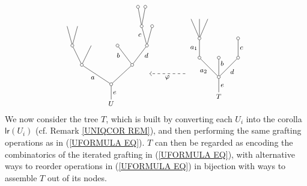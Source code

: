\documentclass[a4paper,10pt]{article}%
\begin{document}
\begin{example}
\begin{equation}
\begin{tikzpicture}[grow=up,auto,level distance=2.1em,
	every node/.style = {font=\footnotesize,inner sep=2pt},
	dummy/.style={circle,draw,inner sep=0pt,minimum size=1.25mm}]
\begin{scope}[yshift=1em]
	\begin{scope}[level distance=2.3em]
	\tikzstyle{level 2}=[sibling distance=3.5em]%
	\tikzstyle{level 3}=[sibling distance=2.25em]%
	\tikzstyle{level 4}=[sibling distance=1.25em]%
	\tikzstyle{level 5}=[sibling distance=0.875em]%
		\node at (5.5,0) {$U$}
			child{node [dummy] {}
				child[sibling distance =5em]{node [dummy] {}
					child[sibling distance =3.5em]{node [dummy] {}
						child{node [dummy] {}
						}
						child{node [dummy] {}
							child{node [dummy] {}}
							child{node [dummy] {}}
						edge from parent node [near end] {$c$}}
					edge from parent node [swap, near end] {$d$}}
					child[sibling distance =3.5em]{node [dummy] {}
					edge from parent node [near end] {$b$}}
				}
				child[sibling distance =7em]{node [dummy] {}
					child
					child{node [dummy] {}
						child
						child
					}
				edge from parent node {$a$}}
			edge from parent node [swap] {$e$}};
	\end{scope}
	\begin{scope}[level distance=2.3em]
	\tikzstyle{level 2}=[sibling distance=2.3em]%
	\tikzstyle{level 4}=[sibling distance=1em]%
		\node at (10,0.3) {$T$}
			child{node [dummy] {}
				child{node [dummy] {}
					child{node [dummy] {}
					edge from parent node [swap] {$c$}}	
				edge from parent node [swap] {$d$}}
				child{node [dummy] {}
				edge from parent node [near end,swap] {$b$}}
				child{node [dummy] {}
					child{node [dummy] {}
						child
						child
						child
					edge from parent node {$a_1$}}
				edge from parent node {$a_2$}}
			edge from parent node [swap] {$e$}};
	\end{scope}
	\draw [->,dashed] (8.6,1.25) -- node {$\varphi$} (7.1,1.25);
\end{scope}
	\end{tikzpicture}
\end{equation}
We now consider the tree $T$, which is built by converting each $U_i$ into the corolla $\mathsf{lr}(U_i)$ (cf. Remark \ref{UNIQCOR REM}), and then performing the same grafting operations as in (\ref{UFORMULA EQ}). $T$ can then be regarded as encoding the combinatorics of the iterated grafting in (\ref{UFORMULA EQ}), with alternative ways to reorder operations in (\ref{UFORMULA EQ}) in bijection with ways to assemble $T$ out of its nodes.



\end{example}
\end{document}
